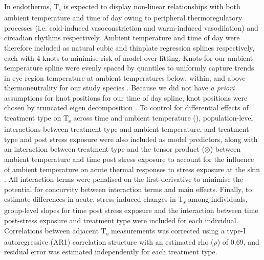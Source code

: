 \documentclass[12pt]{article}
\begin{document}
\noindent In endotherms, T\textsubscript{s} is expected to display non-linear relationships with both ambient temperature and time of day owing to peripheral thermoregulatory processes (i.e. cold-induced vasoconstriction and warm-induced vasodilation) and circadian rhythms \citep{richards_1971,cooper_2005} respectively. Ambient temperature and time of day were therefore included as natural cubic and thinplate regression splines respectively, each with 4 knots to minimise risk of model over-fitting. Knots for our ambient temperature spline were evenly spaced by quantiles to uniformly capture trends in eye region temperature at ambient temperatures below, within, and above thermoneutrality for our study species \citep{grossman_1977}. Because we did not have \textit{a priori} assumptions for knot positions for our time of day spline, knot positions were chosen by truncated eigen decomposition \citep{wood_2003}. To control for differential effects of treatment type on T\textsubscript{s} across time \citep{jerem_2015,jerem_2019} and ambient temperature (\citealt{robertson_2020a}), population-level interactions between treatment type and ambient temperature, and treatment type and post stress exposure were also included as model predictors, along with an interaction between treatment type and the tensor product ($\otimes$) between ambient temperature and time post stress exposure to account for the influence of ambient temperature on acute thermal responses to stress exposure at the skin \citep{nord_2019b}. All interaction terms were penalised on the first derivative to minimise the potential for concurvity between interaction terms and main effects. Finally, to estimate differences in acute, stress-induced changes in T\textsubscript{s} among individuals, group-level slopes for time post stress exposure and the interaction between time post-stress exposure and treatment type were included for each individual. Correlations between adjacent T\textsubscript{s} measurements was corrected using a type-I autoregressive (AR1) correlation structure with an estimated rho ($\rho$) of 0.69, and residual error was estimated independently for each treatment type. \vspace{1cm} 
\end{document}
